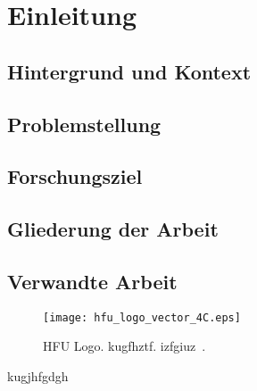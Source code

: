 \chapter{Einleitung}
\section{Hintergrund und Kontext}
\section{Problemstellung}
\section{Forschungsziel}
\section{Gliederung der Arbeit}
\section{Verwandte Arbeit}
\begin{figure}[htbp]  %
    \centering      %
    \texttt{[image: hfu\_logo\_vector\_4C.eps]}
    \caption{
        HFU Logo.
        kugfhztf.
        izfgiuz~\cite{oneil_star_2009}.
    }      %
    \label{pic:hfu_logo}    %
\end{figure}

kugjhfgdgh